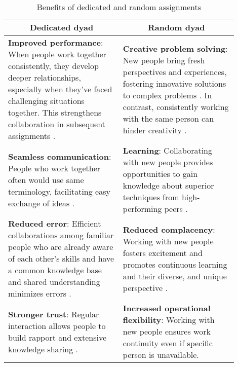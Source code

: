\documentclass[msom,nonblindrev]{01 latex/class/informs3}
\begin{document}
  \begin{table}[h]
    \centering
    \caption{Benefits of dedicated and random assignments}

    \begin{tabular}{|p{0.45\linewidth}|p{0.45\linewidth}|}
        \hline
        \multicolumn{1}{|c|}{Dedicated dyad} & \multicolumn{1}{|c|}{Random dyad}\\
        \hline
        \textbf{Improved performance}: When people work together consistently, they develop deeper relationships, especially when they've faced challenging situations together. This strengthens collaboration in subsequent assignments \citep{berman2002tacit, avgerinos2017team}.
        & 
        \textbf{Creative problem solving}: New people bring fresh perspectives and experiences, fostering innovative solutions to complex problems  \citep{gruenfeld2000groups, choi2005old, edmondson2009product}. In contrast, consistently working with the same person can hinder creativity \citep{ramachandran2017help}.\\
        \hline        
        \textbf{Seamless communication}: People who work together often would use same terminology, facilitating easy exchange of ideas \citep{cramton2001mutual}. 
        & 
        \textbf{Learning}: Collaborating with new people provides opportunities to gain knowledge about superior techniques from high-performing peers \citep{kane2005knowledge, argote2012organizational}.\\
        \hline
        \textbf{Reduced error}: Efficient collaborations among familiar people who are already aware of each other's skills and have a common knowledge base and shared understanding minimizes errors \citep{katz1982effects, littlepage1997effects, huckman2009team}.
        & 
        \textbf{Reduced complacency}: Working with new people fosters excitement and promotes continuous learning and their diverse, and unique perspective  \citep{dixon2018reinventing, ball2017plant}.\\
        \hline
        \textbf{Stronger trust}: Regular interaction allows people to build rapport and extensive knowledge sharing \citep{siemsen2009influence}. 
        & 
        \textbf{Increased operational flexibility}: Working with new people ensures work continuity even if specific person is unavailable.\\
        \hline
    \end{tabular}	
    \label{table:dedicatedvsrandom}
\end{table}
\FloatBarrier
\end{document}
